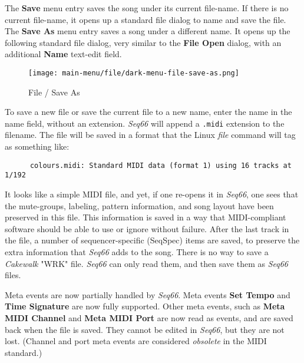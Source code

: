    The \textbf{Save} menu entry saves the song under its current file-name.
   If there is no current file-name, it opens up a standard file
   dialog to name and save the file.
   The \textbf{Save As} menu entry saves a song under a different name.
   It opens up the following standard file dialog, very similar to the 
   \textbf{File Open} dialog, with an additional \textbf{Name} text-edit field.

\begin{figure}[H]
   \centering 
   \texttt{[image: main-menu/file/dark-menu-file-save-as.png]}
   \caption{File / Save As}
   \label{fig:menu_file_save_as}
\end{figure}

   To save a new file or save the current file to a new name,
   enter the name in the name field, without an extension.
   \textsl{Seq66} will append a \texttt{.midi} extension to the filename.
   The file will be saved in a format that the Linux \textsl{file} command
   will tag as something like:

   \begin{verbatim}
      colours.midi: Standard MIDI data (format 1) using 16 tracks at 1/192
   \end{verbatim}

   It looks like a simple MIDI file, and yet, if one re-opens it in
   \textsl{Seq66}, one sees that the mute-groups, labeling, pattern
   information, and song layout have been preserved in this file.
   This information is saved in a way that MIDI-compliant software
   should be able to use or ignore without failure.
   After the last track in the file, a number of
   sequencer-specific (SeqSpec) items are saved, to preserve
   the extra information that \textsl{Seq66} adds to the song.
   There is no way to save a \textsl{Cakewalk} "WRK" file.
   \textsl{Seq66} can only read them, and then save them as
   \textsl{Seq66} files.

   Meta events are now partially handled by \textsl{Seq66}.
   Meta events \textbf{Set Tempo}
   and \textbf{Time Signature}
   are now fully supported.
   Other meta events,
   such as \textbf{Meta MIDI Channel}
   and \textbf{Meta MIDI Port}
   are now read as events, and are saved back when the file is saved.
   They cannot be edited in \textsl{Seq66}, but they are not lost.
   (Channel and port meta events are
   considered \textsl{obsolete} in the MIDI standard.)

